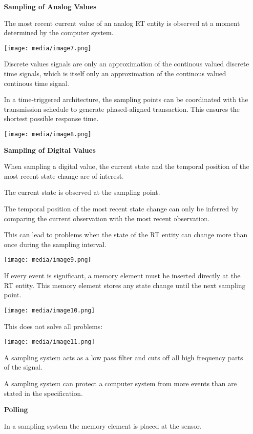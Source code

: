 \textbf{Sampling of Analog Values}

The most recent current value of an analog RT entity is observed at a
moment determined by the computer system.

\texttt{[image: media/image7.png]}

Discrete values signals are only an approximation of the continous
valued discrete time signals, which is itself only an approximation of
the continous valued continous time signal.

In a time-triggered architecture, the sampling points can be coordinated
with the transmission schedule to generate phased-aligned transaction.
This ensures the shortest possible response time.

\texttt{[image: media/image8.png]}

\textbf{Sampling of Digital Values}

When sampling a digital value, the current state and the temporal
position of the most recent state change are of interest.

The current state is observed at the sampling point.

The temporal position of the most recent state change can only be
inferred by comparing the current observation with the most recent
observation.

This can lead to problems when the state of the RT entity can change
more than once during the sampling interval.

\texttt{[image: media/image9.png]}

If every event is significant, a memory element must be inserted
directly at the RT entity. This memory element stores any state change
until the next sampling point.

\texttt{[image: media/image10.png]}

This does not solve all problems:

\texttt{[image: media/image11.png]}

A sampling system acts as a low pass filter and cuts off all high
frequency parts of the signal.

A sampling system can protect a computer system from more events than
are stated in the specification.

\textbf{Polling}

In a sampling system the memory element is placed at the sensor.

